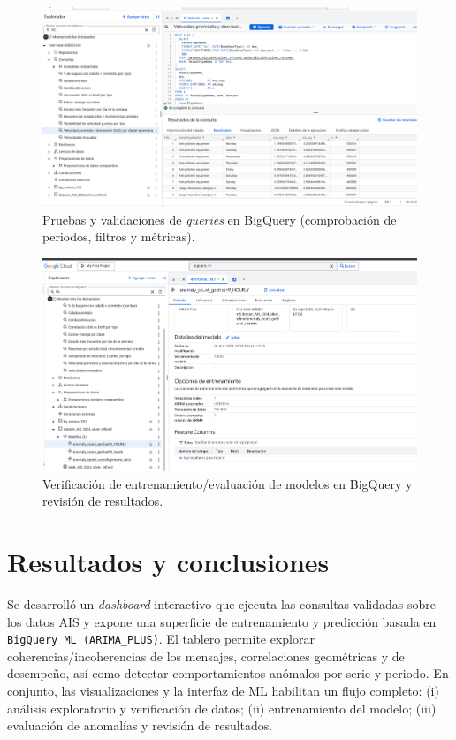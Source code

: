 \documentclass[10pt]{article}
\begin{document}
\begin{figure}[htbp]
  \centering
  \includegraphics[width=0.6\linewidth]{figures/QuerysBQ.png}
  \caption{Pruebas y validaciones de \textit{queries} en BigQuery (comprobación de periodos, filtros y métricas).}
  \label{fig:queries-bq}
\end{figure}

\begin{figure}[htbp]
  \centering
  \includegraphics[width=0.6\linewidth]{figures/ModelosBQ.png}
  \caption{Verificación de entrenamiento/evaluación de modelos en BigQuery y revisión de resultados.}
  \label{fig:modelos-bq}
\end{figure}
\section{Resultados y conclusiones}

Se desarrolló un \textit{dashboard} interactivo que ejecuta las consultas validadas sobre los datos AIS y expone una superficie de entrenamiento y predicción basada en \texttt{BigQuery ML (ARIMA\_PLUS)}. El tablero permite explorar coherencias/incoherencias de los mensajes, correlaciones geométricas y de desempeño, así como detectar comportamientos anómalos por serie y periodo. En conjunto, las visualizaciones y la interfaz de ML habilitan un flujo completo: (i) análisis exploratorio y verificación de datos; (ii) entrenamiento del modelo; (iii) evaluación de anomalías y revisión de resultados.
\newpage
\end{document}
